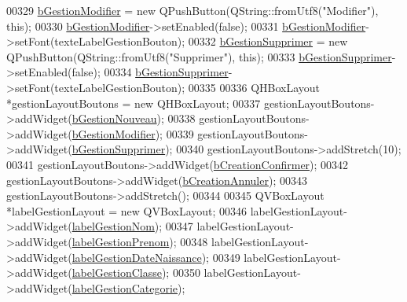 \begin{DoxyCode}
00329     \hyperlink{class_i_h_m_gestion_cross_a524ced9992dcc4e7ee25b01e30c4c5df}{bGestionModifier} = \textcolor{keyword}{new} QPushButton(QString::fromUtf8(\textcolor{stringliteral}{"Modifier"}), \textcolor{keyword}{this});
00330     \hyperlink{class_i_h_m_gestion_cross_a524ced9992dcc4e7ee25b01e30c4c5df}{bGestionModifier}->setEnabled(\textcolor{keyword}{false});
00331     \hyperlink{class_i_h_m_gestion_cross_a524ced9992dcc4e7ee25b01e30c4c5df}{bGestionModifier}->setFont(texteLabelGestionBouton);
00332     \hyperlink{class_i_h_m_gestion_cross_adc5bed6caf7f597dd30999bc871e695b}{bGestionSupprimer} = \textcolor{keyword}{new} QPushButton(QString::fromUtf8(\textcolor{stringliteral}{"Supprimer"}), \textcolor{keyword}{this});
00333     \hyperlink{class_i_h_m_gestion_cross_adc5bed6caf7f597dd30999bc871e695b}{bGestionSupprimer}->setEnabled(\textcolor{keyword}{false});
00334     \hyperlink{class_i_h_m_gestion_cross_adc5bed6caf7f597dd30999bc871e695b}{bGestionSupprimer}->setFont(texteLabelGestionBouton);
00335 
00336     QHBoxLayout *gestionLayoutBoutons = \textcolor{keyword}{new} QHBoxLayout;
00337     gestionLayoutBoutons->addWidget(\hyperlink{class_i_h_m_gestion_cross_ab987235a79961d3d186878052a02b21b}{bGestionNouveau});
00338     gestionLayoutBoutons->addWidget(\hyperlink{class_i_h_m_gestion_cross_a524ced9992dcc4e7ee25b01e30c4c5df}{bGestionModifier});
00339     gestionLayoutBoutons->addWidget(\hyperlink{class_i_h_m_gestion_cross_adc5bed6caf7f597dd30999bc871e695b}{bGestionSupprimer});
00340     gestionLayoutBoutons->addStretch(10);
00341     gestionLayoutBoutons->addWidget(\hyperlink{class_i_h_m_gestion_cross_aac8a7363e20bc9ba2f65b7d9b3bc856e}{bCreationConfirmer});
00342     gestionLayoutBoutons->addWidget(\hyperlink{class_i_h_m_gestion_cross_a297a77054dc0f54e461c0f9b0382efb3}{bCreationAnnuler});
00343     gestionLayoutBoutons->addStretch();
00344 
00345     QVBoxLayout *labelGestionLayout = \textcolor{keyword}{new} QVBoxLayout;
00346     labelGestionLayout->addWidget(\hyperlink{class_i_h_m_gestion_cross_a866a6f0ba317b299d4aede5fc276b2bb}{labelGestionNom});
00347     labelGestionLayout->addWidget(\hyperlink{class_i_h_m_gestion_cross_ae213fa44e6e291f9ca02d8b091ab0d06}{labelGestionPrenom});
00348     labelGestionLayout->addWidget(\hyperlink{class_i_h_m_gestion_cross_af15625b1b1bfb04468f0ed7c6ba39b1b}{labelGestionDateNaissance});
00349     labelGestionLayout->addWidget(\hyperlink{class_i_h_m_gestion_cross_a4f070ed70d6d076d07c96562e366c805}{labelGestionClasse});
00350     labelGestionLayout->addWidget(\hyperlink{class_i_h_m_gestion_cross_a04af17f1ebbbbac6d9c4509c94bc6f39}{labelGestionCategorie});

\end{DoxyCode}
